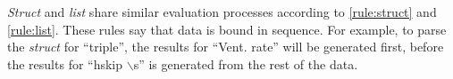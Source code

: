 {\em Struct} and {\em list} share 
similar evaluation processes according to 
\ref{rule:struct} and \ref{rule:list}. These rules say 
that data is bound in sequence. For example, to parse the {\em struct} 
for ``triple'', the results for ``Vent. rate'' will be generated first, 
before the results for ``hskip $\backslash$s'' is generated from the rest
of the data.






